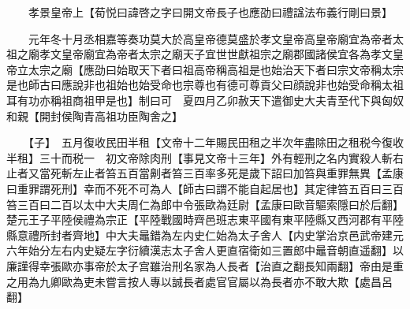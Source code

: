 　　孝景皇帝上【荀悦曰諱啓之字曰開文帝長子也應劭曰禮諡法布義行剛曰景】

　　元年冬十月丞相嘉等奏功莫大於高皇帝德莫盛於孝文皇帝高皇帝廟宜為帝者太祖之廟孝文皇帝廟宜為帝者太宗之廟天子宜世世獻祖宗之廟郡國諸侯宜各為孝文皇帝立太宗之廟【應劭曰始取天下者曰祖高帝稱高祖是也始治天下者曰宗文帝稱太宗是也師古曰應說非也祖始也始受命也宗尊也有德可尊貢父曰顔說非也始受命稱太祖耳有功亦稱祖商祖甲是也】制曰可　夏四月乙卯赦天下遣御史大夫青至代下與匈奴和親【開封侯陶青高祖功臣陶舍之】

　　【子】　五月復收民田半租【文帝十二年賜民田租之半次年盡除田之租税今復收半租】三十而税一　初文帝除肉刑【事見文帝十三年】外有輕刑之名内實殺人斬右止者又當死斬左止者笞五百當劓者笞三百率多死是歲下詔曰加笞與重罪無異【孟康曰重罪謂死刑】幸而不死不可為人【師古曰謂不能自起居也】其定律笞五百曰三百笞三百曰二百以太中大夫周仁為郎中令張歐為廷尉【孟康曰歐音驅索隱曰於后翻】楚元王子平陸侯禮為宗正【平陸戰國時齊邑班志東平國有東平陸縣又西河郡有平陸縣意禮所封者齊地】中大夫鼂錯為左内史仁始為太子舍人【内史掌治京邑武帝建元六年始分左右内史疑左字衍續漢志太子舍人更直宿衛如三置郎中鼂音朝直遥翻】以廉謹得幸張歐亦事帝於太子宫雖治刑名家為人長者【治直之翻長知兩翻】帝由是重之用為九卿歐為吏未嘗言按人專以誠長者處官官屬以為長者亦不敢大欺【處昌呂翻】

